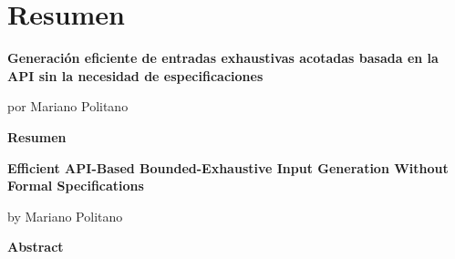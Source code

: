 \chapter*{Resumen}

\begin{center}
    \Large
    \textbf{Generación eficiente de entradas exhaustivas acotadas basada en la API sin la necesidad de especificaciones}
        
    \vspace{0.4cm}
    \large
    por Mariano Politano
        
    \vspace{0.9cm}
    \textbf{Resumen}
\end{center}

\vspace{0.5cm}

\newpage

\begin{center}
    \Large
    \textbf{Efficient API-Based Bounded-Exhaustive Input Generation Without Formal Specifications}
        
    \vspace{0.4cm}
    \large
    by Mariano Politano
        
    \vspace{0.6cm}
    \textbf{Abstract}
\end{center}